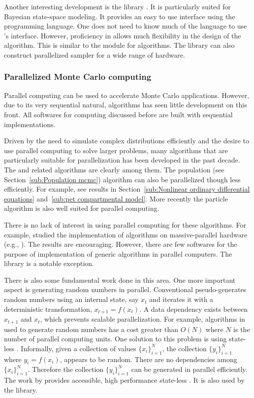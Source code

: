 Another interesting development is the \libbi library \cite{libbi}. It is particularly suited for Bayesian state-space modeling. It provides an easy to use interface using the \perl programming language. One does not need to know much of the language to use \libbi's interface. However, proficiency in \perl allows much flexibility in the design of the algorithm. This is similar to the \pymc module for \mcmc algorithms. The library can also construct parallelized sampler for a wide range of hardware.

\subsubsection{Parallelized Monte Carlo computing}
\label{ssub:Parallelized Monte Carlo computing}

Parallel computing can be used to accelerate Monte Carlo applications. However, due to its very sequential natural, \mcmc algorithms has seen little development on this front. All softwares for \mcmc computing discussed before are built with sequential implementations.

Driven by the need to simulate complex distributions efficiently and the desire to use parallel computing to solve larger problems, many algorithms that are particularly suitable for parallelization has been developed in the past decade. The \smc and related algorithms are clearly among them. The population \mcmc (see Section~\ref{sub:Population mcmc}) algorithm can also be parallelized though less efficiently. For example, see results in Section~\ref{sub:Nonlinear ordinary differential equations} and~\ref{sub:pet compartmental model}. More recently the particle \mcmc algorithm \cite{Andrieu:2010gc} is also well suited for parallel computing.

There is no lack of interest in using parallel computing for these algorithms. For example, \cite{Lee:2010fm} studied the implementation of \smc algorithms on massive-parallel hardware (e.g., \gpu). The results are encouraging. However, there are few softwares for the purpose of implementation of generic \smc algorithms in parallel computers. The \libbi library is a notable exception.

There is also some fundamental work done in this area. One more important aspect is generating random numbers in parallel. Conventional pseudo-\rng generates random numbers using an internal state, say $x_t$ and iterates it with a deterministic transformation, $x_{t+1} = f(x_t)$. A data dependency exists between $x_{t+1}$ and $x_t$, which prevents scalable parallelization. For example, algorithms in \cite{Lee:2010fm} used to generate random numbers has a cost greater than $O(N)$ where $N$ is the number of parallel computing units. One solution to this problem is using state-less \rng. Informally, given a collection of values $\{x_i\}_{i=1}^N$, the collection $\{y_i\}_{i=1}^N$ where $y_i = f(x_i)$, appears to be random. There are no dependencies among $\{x_i\}_{i=1}^N$. Therefore the collection $\{y_i\}_{i=1}^N$ can be generated in parallel efficiently. The work by \cite{Salmon:2011um} provides accessible, high performance state-less \rng. It is also used by the \vsmc library.


